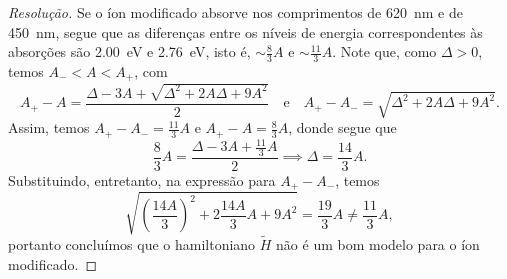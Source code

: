 \begin{proof}[Resolução]
    Se o íon modificado absorve nos comprimentos de \SI{620}{nm} e de \SI{450}{nm}, segue que as diferenças entre os níveis de energia correspondentes às absorções são \SI{2.00}{eV} e \SI{2.76}{eV}, isto é, \(\sim \frac{8}{3}A\) e \(\sim \frac{11}{3}A\). Note que, como \(\Delta > 0\), temos \(A_- < A < A_+\), com
    \begin{equation*}
        A_+ - A = \frac{\Delta - 3A + \sqrt{\Delta^2 + 2A \Delta + 9A^2}}{2} \quad\text{e}\quad
        A_+ - A_- = \sqrt{\Delta^2 + 2A \Delta + 9A^2}.
    \end{equation*}
    Assim, temos \(A_+ - A_- = \frac{11}{3}A\) e \(A_+ - A = \frac83A\), donde segue que
    \begin{equation*}
        \frac{8}{3}A = \frac{\Delta -3A+ \frac{11}{3}A}{2} \implies \Delta = \frac{14}{3}A.
    \end{equation*}
    Substituindo, entretanto, na expressão para \(A_+ - A_-\), temos
    \begin{equation*}
        \sqrt{\left(\frac{14A}{3}\right)^2 + 2\frac{14A}{3}A + 9A^2} = \frac{19}{3} A \neq \frac{11}{3}A,
    \end{equation*}
    portanto concluímos que o hamiltoniano \(\tilde{H}\) não é um bom modelo para o íon modificado.
\end{proof}
